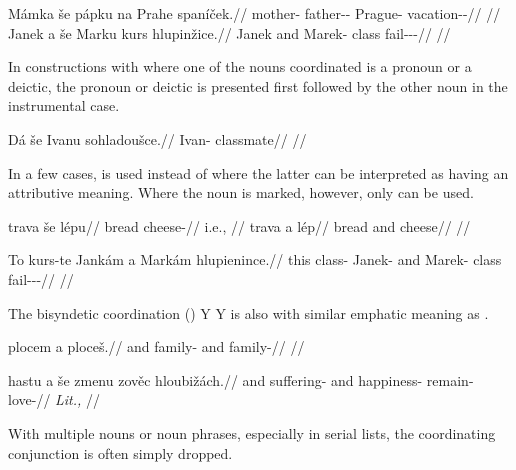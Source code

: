 \pex
\begingl
    \gla Mámka {še} pápku na Prahe spaníček.//
    \glb mother-\Dim{} \Com{} father-\Dim{}-\Ins{} \Loc{} Prague-\Acc{} vacation-\Av{}-\Pf{}//
    \glft {}//
\endgl
\xe
\pex
\begingl
    \gla Janek {a} {še} Marku kurs hlupinžice.//
    \glb Janek and \Com{} Marek-\Ins{} class fail-\Av{}-\Pf{}-\Quot{}//
    \glft {}//
\endgl
\xe

In constructions with  where one of the nouns coordinated is a pronoun or a deictic, the pronoun or deictic is presented first followed by the other noun in the instrumental case.

\pex
\begingl
    \gla Dá {še} Ivanu sohladoušce.//
    \glb {} \Com{} Ivan-\Ins{} classmate//
    \glft {}//
\endgl
\xe

In a few cases,  is used instead of  where the latter can be interpreted as having an attributive meaning. Where the noun is marked, however, only  can be used.

\begin{multicols}{2}
\pex\a
\begingl
    \gla trava {še} lépu//
    \glb bread \Com{} cheese-\Ins{}//
    \glft {} i.e., //
\endgl
\a
\begingl
    \gla trava {a} lép//
    \glb bread and cheese//
    \glft {}//
\endgl
\xe\end{multicols}

\pex
\begingl
    \gla To kurs-te Jankám {a} Markám hlupienince.//
    \glb this class-\Foc{} Janek-\Agt{} and Marek-\Agt{} class fail-\Pv{}-\Pf{}-\Quot{}//
    \glft {}//
\endgl
\xe


The bisyndetic coordination (\cite{velupillai2012})  Y  Y is also with similar emphatic meaning as .

\pex
\begingl
     plocem {a} ploceš.//
    \glb and family-\First{}\Sg{} and family-//
    \glft {}//
\endgl
\xe

\pex
\begingl
     hastu {a} še zmenu zověc hloubižách.//
    \glb and suffering-\mk{} and \Com{} happiness-\Ins{} remain-\Cv{} love-//
    \glft {} \emph{Lit.,} //
\endgl
\xe

With multiple nouns or noun phrases, especially in serial lists, the coordinating conjunction is often simply dropped.

